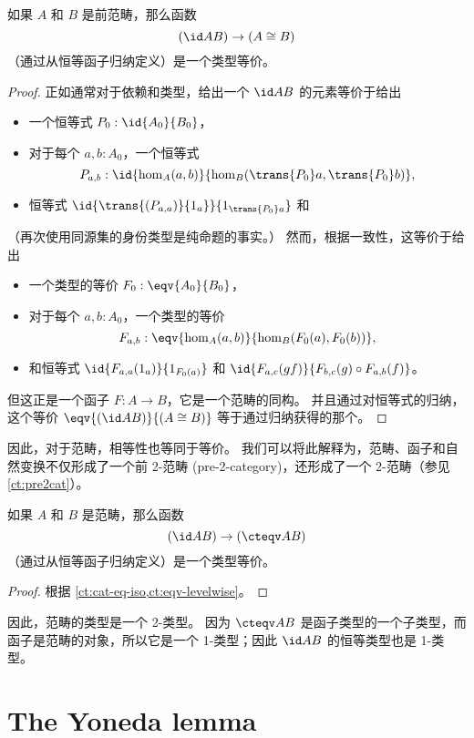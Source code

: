 \begin{lem}\label{ct:cat-eq-iso}
如果 $A$ 和 $B$ 是前范畴，那么函数
\[(\id A B) \to (A\cong B)\]
（通过从恒等函子归纳定义）是一个类型等价。
\end{lem}
\begin{proof}
  正如通常对于依赖和类型，给出一个 $\id A B$ 的元素等价于给出
  \begin{itemize}
    \item 一个恒等式 $P_0:\id{A_0}{B_0}$，
    \item 对于每个 $a,b:A_0$，一个恒等式
    \[P_{a,b}:\id{\hom_A(a,b)}{\hom_B(\trans {P_0} a,\trans {P_0} b)},\]
    \item 恒等式 $\id{\trans {(P_{a,a})} {1_a}}{1_{\trans {P_0} a}}$ 和
  \end{itemize}
  （再次使用同源集的身份类型是纯命题的事实。）
  然而，根据一致性，这等价于给出
  \begin{itemize}
    \item 一个类型的等价 $F_0:\eqv{A_0}{B_0}$，
    \item 对于每个 $a,b:A_0$，一个类型的等价
    \[F_{a,b}:\eqv{\hom_A(a,b)}{\hom_B(F_0 (a),F_0 (b))},\]
    \item 和恒等式 $\id{F_{a,a}(1_a)}{1_{F_0 (a)}}$ 和 $\id{F_{a,c}(gf)}{F_{b,c} (g)\circ F_{a,b} (f)}$。
  \end{itemize}
  但这正是一个函子 $F:A\to B$，它是一个范畴的同构。
  并且通过对恒等式的归纳，这个等价 $\eqv{(\id A B)}{(A\cong B)}$ 等于通过归纳获得的那个。
\end{proof}

因此，对于范畴，相等性也等同于等价。
我们可以将此解释为，范畴、函子和自然变换不仅形成了一个前 2-范畴 (pre-2-category)，还形成了一个 2-范畴（参见 \cref{ct:pre2cat}）。

\begin{thm}\label{ct:cat-2cat}
如果 $A$ 和 $B$ 是范畴，那么函数
\[(\id A B) \to (\cteqv A B)\]
（通过从恒等函子归纳定义）是一个类型等价。
\end{thm}
\begin{proof}
  根据 \cref{ct:cat-eq-iso,ct:eqv-levelwise}。
\end{proof}

因此，范畴的类型是一个 2-类型。
因为 $\cteqv A B$ 是函子类型的一个子类型，而函子是范畴的对象，所以它是一个 1-类型；因此 $\id A B$ 的恒等类型也是 1-类型。

\section{The Yoneda lemma}
\label{sec:yoneda}

